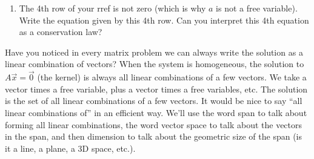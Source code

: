 \begin{problem}
\begin{enumerate}
\item 
The 4th row of your rref is not zero (which is why $a$ is not a free variable).  
Write the equation given by this 4th row.  Can you interpret this 4th equation as a conservation law?
\end{enumerate}
\end{problem}









\mysubsection{\idealin}

Have you noticed in every matrix problem we can always write the solution as a linear combination of vectors? 
When the system is homogeneous, the solution to $A\vec x = \vec 0$ (the kernel) is always all linear combinations of a few vectors. We take a vector times a free variable, plus a vector times a free variables, etc. The solution is the set of all linear combinations of a few vectors. It would be nice to say ``all linear combinations of'' in an efficient way. We'll use the word span to talk about forming all linear combinations, the word vector space to talk about the vectors in the span, and then dimension to talk about the geometric size of the span (is it a line, a plane, a 3D space, etc.).

